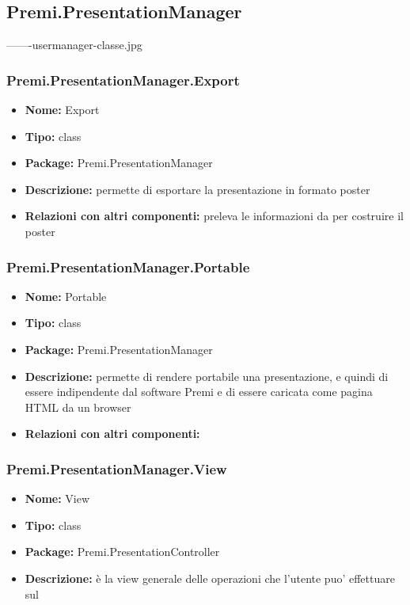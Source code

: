 \subsection{Premi.PresentationManager}
-------usermanager-classe.jpg
\subsubsection{Premi.PresentationManager.Export}
\begin{itemize}
  \item \textbf{Nome:} Export 
  \item \textbf{Tipo:} class
  \item \textbf{Package:} Premi.PresentationManager
  \item \textbf{Descrizione:} permette di esportare la presentazione in formato poster
  \item \textbf{Relazioni con altri componenti:} preleva le informazioni da  per costruire il poster
\end{itemize}
\subsubsection{Premi.PresentationManager.Portable}
\begin{itemize}
  \item \textbf{Nome:} Portable
  \item \textbf{Tipo:} class
  \item \textbf{Package:} Premi.PresentationManager
  \item \textbf{Descrizione:} permette di rendere portabile una presentazione, e quindi di essere indipendente dal software Premi e di essere caricata come pagina HTML da un browser
  \item \textbf{Relazioni con altri componenti:} 
\end{itemize}
\subsubsection{Premi.PresentationManager.View}
\begin{itemize}
  \item \textbf{Nome:} View
  \item \textbf{Tipo:} class
  \item \textbf{Package:} Premi.PresentationController
  \item \textbf{Descrizione:} è la view generale delle operazioni che l'utente puo' effettuare sul
\end{itemize}
